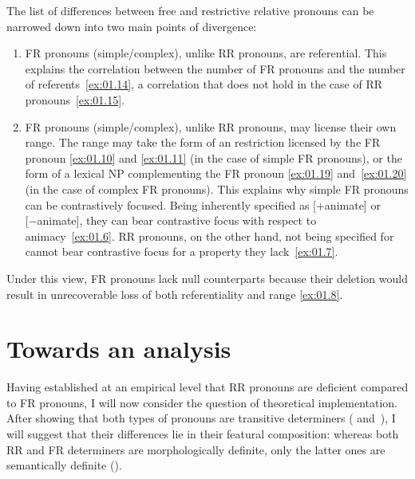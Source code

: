\documentclass[output=paper]{langsci/langscibook}
\begin{document}
The list of differences between free and restrictive relative pronouns can be
narrowed down into two main points of divergence:

\begin{enumerate}
\item \gls{FR} pronouns (simple/complex), unlike \gls{RR} pronouns, are
referential. This explains the correlation between the number of \gls{FR}
pronouns and the number of referents~\eqref{ex:01.14}, a correlation that does not hold in
the case of \gls{RR} pronouns~\eqref{ex:01.15}.

\item \gls{FR} pronouns
(simple/complex), unlike \gls{RR} pronouns, may license their own range. The
range may take the form of an  restriction licensed by the
\gls{FR} pronoun \eqref{ex:01.10} and \eqref{ex:01.11} (in the case of
simple \gls{FR} pronouns), or the form of a lexical NP complementing the
\gls{FR} pronoun \eqref{ex:01.19} and~\eqref{ex:01.20} (in the case of
complex \gls{FR} pronouns). This explains why simple \gls{FR} pronouns can be
contrastively focused. Being inherently specified as [+animate] or
[−animate], they can bear contrastive focus with respect to animacy~\eqref{ex:01.6}.  \gls{RR} pronouns, on
    the other hand, not being specified for  cannot bear
    contrastive focus for a property they
    lack~\eqref{ex:01.7}.
\end{enumerate}

Under this view, \gls{FR} pronouns lack null counterparts because their
deletion would result in unrecoverable loss of both referentiality and range
\eqref{ex:01.8}.

\section{Towards an analysis}\label{sec:01.4}

Having established at an empirical level that \gls{RR} pronouns are deficient compared to \gls{FR}
pronouns, I will now consider the question of theoretical implementation.
After showing that both types of pronouns are transitive determiners
( and~), I will suggest that their differences
lie in their featural composition: whereas both \gls{RR} and \gls{FR}
determiners are morphologically definite, only the latter ones are semantically
definite ().
\end{document}
